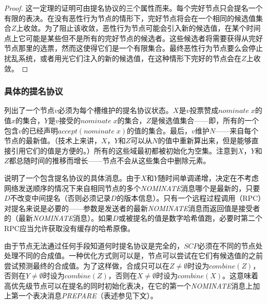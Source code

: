 \begin{proof}
	这一定理的证明可由提名协议的三个属性而来。每个完好节点只会提名一个有限的表决。在没有恶性行为节点的情形下，完好节点将会在一个相同的候选值集合$Z$上收敛。为了阻止该收敛，恶性行为节点可能会引入新的候选值，在某个时间点上它可能是某些但不是所有的完好节点的候选者。这些候选者将需要获得从完好节点那里的选票，然而这使得它们是一个有限集合。最终恶性行为节点要么会停止扰乱系统，或者用光它们注入的新的候选值，在这种情形下完好的节点会在$Z$上收敛。
\end{proof}

\subsubsection{具体的提名协议}

列出了一个节点$v$必须为每个槽维护的提名协议状态。$X$是$v$投票赞成$nominate\;x$的值$x$的集合，$Y$是$v$接受的$nominate\;x$的集合，$Z$是候选值集合——即，所有的一个包含$v$的{\quorum}已经声明$accept(nominate\;x)$的值的集合。最后，$v$维护$N$——来自每个节点的最新值。（技术上来讲，$X$，$Y$和$Z$可以从$N$的值中重新算出来，但是能够直接引用它们的值是方便的。）所有的这些域最初都被初始化为空集。注意到$X$，$Y$和$Z$都总随时间的推移而增长——节点不会从这些集合中删除元素。

说明了一个包含提名协议的具体消息。由于$X$和$Y$随时间单调递增，决定在不考虑网络发送顺序的情况下来自相同节点的多个\textsl{NOMINATE}消息哪个是最新的，只要$D$不改变中间提名（否则必须记录$D$的版本信息）。只有一个远程过程调用（RPC）对提名来说是必要的——参数是发送者的最新\textsl{NOMINATE}消息而返回值是接受者的（最新\textsl{NOMINATE}消息）。如果$D$或被提名的值是数字哈希值跑，必要时第二个RPC应当允许获取没有缓存的哈希原像。

由于节点无法通过任何手段知道何时提名协议是完全的，$SCP$必须在不同的节点处处理不同的合成值。一种优化方式则可以是，节点可以尝试在它们有候选值的之前尝试预测最终的合成值。为了这样做，合成只可以在$Z\neq \emptyset$时设为$combine(Z)$，否则在$Y\neq \emptyset$时设为$combine(Z)$，否则在$X\neq \emptyset$时设为$combine(X)$。这意味着高优先级节点可以在提名的同时初始化表决，在它的第一个\textsl{NOMINATE}消息上加上第一个表决消息\textsl{PREPARE}（表述参见下文）。